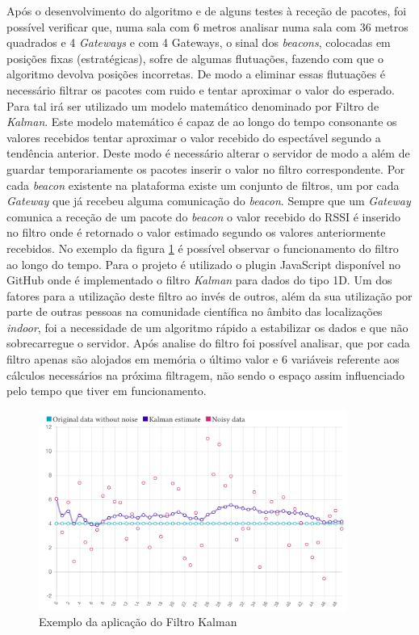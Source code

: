 \par Após o desenvolvimento do algoritmo e de alguns testes à receção de pacotes, foi possível verificar que, numa sala com 6 metros analisar numa sala com 36 metros quadrados e 4 \textit{Gateways} e com 4 Gateways, o sinal dos \textit{beacons}, colocadas em posições fixas (estratégicas), sofre de algumas flutuações, fazendo com que o algoritmo devolva posições incorretas. De modo a eliminar essas flutuações é necessário filtrar os pacotes com ruido e tentar aproximar o valor do esperado. Para tal irá ser utilizado um modelo matemático denominado por Filtro de \textit{Kalman}\cite{KalmanFilter2}. Este modelo matemático é capaz de ao longo do tempo consonante os valores recebidos tentar aproximar o valor recebido do espectável segundo a tendência anterior. Deste modo é necessário alterar o servidor de modo a além de guardar temporariamente os pacotes inserir o valor no filtro correspondente. Por cada \textit{beacon} existente na plataforma existe um conjunto de filtros, um por cada \textit{Gateway} que já recebeu alguma comunicação do \textit{beacon}. Sempre que um \textit{Gateway} comunica a receção de um pacote do \textit{beacon} o valor recebido do RSSI é inserido no filtro onde é retornado o valor estimado segundo os valores anteriormente recebidos. No exemplo da figura \ref{kalman1} é possível observar o funcionamento do filtro ao longo do tempo. Para o projeto é utilizado o plugin JavaScript\cite{kalman} disponível no GitHub onde é implementado o filtro \textit{Kalman} para dados do tipo 1D. Um dos fatores para a utilização deste filtro ao invés de outros, além da sua utilização por parte de outras pessoas na comunidade científica no âmbito das localizações \textit{indoor}, foi a necessidade de um algoritmo rápido a estabilizar os dados e que não sobrecarregue o servidor. Após analise do filtro foi possível analisar, que por cada filtro apenas são alojados em memória o último valor e 6 variáveis referente aos cálculos necessários na próxima filtragem, não sendo o espaço assim influenciado pelo tempo que tiver em funcionamento.

\begin{figure}[ht]
\centering
\includegraphics[width=0.90\textwidth]{images/kalman-example.png}
\caption{Exemplo da aplicação do Filtro Kalman \cite{kalman}}\label{kalman1}
\end{figure}



